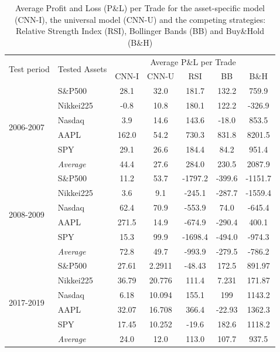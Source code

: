 \documentclass[12pt, a4paper]{article}
\begin{document}
\begin{table}[H]
\centering
\begin{tabular}{l|l|ccccc}
        \multicolumn{1}{m{1cm}|}{\multirow{2}{1cm}{Test period}} & \multicolumn{1}{m{1.5cm}|}{\multirow{2}{1.5cm}{Tested Assets}}  &       \multicolumn{5}{c}{Average P\&L per Trade}  \\ \cline{3-7}
          &           & CNN-I   & CNN-U   & RSI     & BB      & B\&H    \\
          \hline \hline
\multirow{6}{1cm}{2006-2007} & S\&P500   & 28.1   & 32.0   & 181.7  & 132.2  & 759.9  \\
          & Nikkei225 &-0.8   & 10.8   & 180.1  & 122.2  & -326.9 \\
          & Nasdaq   & 3.9    & 14.6   & 143.6  & -18.0  & 853.5  \\
          & AAPL     & 162.0  & 54.2   & 730.3  & 831.8  & 8201.5 \\
          & SPY       & 29.1   & 26.6   & 184.4  & 84.2   & 951.4  \\
          \cline{2-7}
          & \textit{Average}    & 44.4   & 27.6   & 284.0  & 230.5  & 2087.9 \\
          \hline
\multirow{6}{1cm}{2008-2009} & S\&P500   & 11.2  & 53.7 & -1797.2 & -399.6 & -1151.7 \\
 & Nikkei225 & 3.6   & 9.1  & -245.1  & -287.7 & -1559.4 \\
 & Nasdaq    & 62.4  & 70.9 & -553.9  & 74.0   & -645.4  \\
 & AAPL      & 271.5 & 14.9 & -674.9  & -290.4 & 400.1   \\
 & SPY       & 15.3  & 99.9 & -1698.4 & -494.0 & -974.3 \\ \cline{2-7} 
 & \textit{Average} & 72.8  & 49.7   & -993.9 & -279.5 & -786.2 \\
\hline
\multirow{6}{1cm}{2017-2019}   & S\&P500  & 27.61  & 2.2911 & -48.43 & 172.5  & 891.97 \\
          & Nikkei225 & 36.79  & 20.776 & 111.4  & 7.231  & 171.87 \\
          & Nasdaq    & 6.18   & 10.094 & 155.1  & 199    & 1143.2 \\
          & AAPL    & 32.07  & 16.708 & 366.4  & -22.93 & 1362.3 \\
          & SPY   & 17.45  & 10.252 & -19.6  & 182.6  & 1118.2 \\
          \cline{2-7}
          & \textit{Average}   & 24.0   & 12.0   & 113.0  & 107.7  & 937.5 
\end{tabular}
\caption{Average Profit and Loss (P\&L) per Trade for the asset-specific model (CNN-I), the universal model (CNN-U) and the competing strategies: Relative Strength Index (RSI), Bollinger Bands (BB) and Buy\&Hold (B\&H)}
\label{tbl:PandLAvg}
\end{table}
\end{document}
